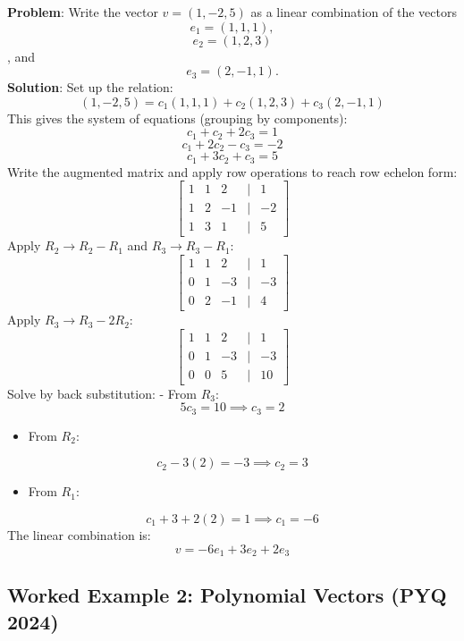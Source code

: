 \documentclass[
]{article}
\providecommand{\tightlist}{%
  \setlength{\itemsep}{0pt}\setlength{\parskip}{0pt}}
\begin{document}
\textbf{Problem}: Write the vector \(v = (1, -2, 5)\) as a linear
combination of the vectors
\[
e_1 = (1, 1, 1),
\]
\[
e_2 = (1, 2, 3)
\]
, and
\[
e_3 = (2, -1, 1).
\]
\textbf{Solution}: Set up the relation:
\[
(1, -2, 5) = c_1(1, 1, 1) + c_2(1, 2, 3) + c_3(2, -1, 1)
\]
This gives the system of equations (grouping by components):
\[
c_1 + c_2 + 2c_3 = 1
\]
\[
c_1 + 2c_2 - c_3 = -2
\]
\[
c_1 + 3c_2 + c_3 = 5
\]
Write the augmented matrix and apply row operations to reach row echelon
form:
\[
\begin{bmatrix}
1 & 1 & 2 & \lvert  & 1 \\
1 & 2 & -1 &  \rvert & -2 \\
1 & 3 & 1 & \lvert  & 5
\end{bmatrix}
\]
Apply \(R_2 \to R_2 - R_1\) and \(R_3 \to R_3 - R_1\):
\[
\begin{bmatrix}
1 & 1 & 2 & \lvert  & 1 \\
0 & 1 & -3 &  \rvert & -3 \\
0 & 2 & -1 & \lvert  & 4
\end{bmatrix}
\]
Apply \(R_3 \to R_3 - 2R_2\):
\[
\begin{bmatrix}
1 & 1 & 2 & \lvert  & 1 \\
0 & 1 & -3 &  \rvert & -3 \\
0 & 0 & 5 & \lvert  & 10
\end{bmatrix}
\]
Solve by back substitution: - From \(R_3\):
\[
5c_3 = 10 \implies c_3 = 2
\]
\begin{itemize}
\tightlist
\item
  From \(R_2\):
\end{itemize}
\[
c_2 - 3(2) = -3 \implies c_2 = 3
\]
\begin{itemize}
\tightlist
\item
  From \(R_1\):
\end{itemize}
\[
c_1 + 3 + 2(2) = 1 \implies c_1 = -6
\]
The linear combination is:
\[
v = -6e_1 + 3e_2 + 2e_3
\]

\subsection{Worked Example 2: Polynomial Vectors (PYQ
2024)}\label{worked-example-2-polynomial-vectors-pyq-2024}
\end{document}
